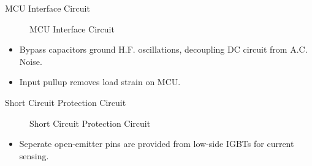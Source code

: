 
\begin{frame}{MCU Interface Circuit}
	\begin{figure}
		\centering


		\caption{MCU Interface Circuit}
	\end{figure}

	\begin{itemize}
		\item Bypass capacitors ground H.F. oscillations, decoupling DC circuit from A.C. Noise.
		\item Input pullup removes load strain on MCU.
	\end{itemize}
\end{frame}



\begin{frame}{Short Circuit Protection Circuit}
	\begin{figure}
		\centering


		\caption{Short Circuit Protection Circuit}
	\end{figure}


	\begin{itemize}
		\item Seperate open-emitter pins are provided from low-side IGBTs for current sensing.
	\end{itemize}
\end{frame}



